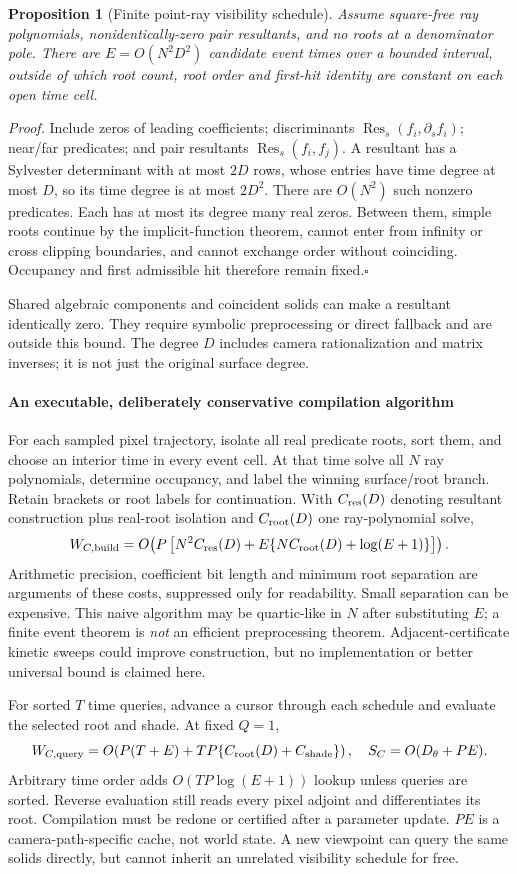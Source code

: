 \documentclass[11pt,letterpaper]{article}
\newcommand{\mini}[1]{\paragraph{#1}}
\newtheorem{prop}{Proposition}
\newcommand{\briefproof}[1]{\textit{Proof.} #1\hfill$\square$\par}
\begin{document}
\begin{prop}[Finite point-ray visibility schedule]
Assume square-free ray polynomials, nonidentically-zero pair resultants, and no roots at a denominator pole. There are $E=O(N^2D^2)$ candidate event times over a bounded interval, outside of which root count, root order and first-hit identity are constant on each open time cell.
\end{prop}
\briefproof{Include zeros of leading coefficients; discriminants $\operatorname{Res}_s(f_i,\partial_s f_i)$; near/far predicates; and pair resultants $\operatorname{Res}_s(f_i,f_j)$. A resultant has a Sylvester determinant with at most $2D$ rows, whose entries have time degree at most $D$, so its time degree is at most $2D^2$. There are $O(N^2)$ such nonzero predicates. Each has at most its degree many real zeros. Between them, simple roots continue by the implicit-function theorem, cannot enter from infinity or cross clipping boundaries, and cannot exchange order without coinciding. Occupancy and first admissible hit therefore remain fixed.}
Shared algebraic components and coincident solids can make a resultant identically zero. They require symbolic preprocessing or direct fallback and are outside this bound. The degree $D$ includes camera rationalization and matrix inverses; it is not just the original surface degree.

\mini{An executable, deliberately conservative compilation algorithm}
For each sampled pixel trajectory, isolate all real predicate roots, sort them, and choose an interior time in every event cell. At that time solve all $N$ ray polynomials, determine occupancy, and label the winning surface/root branch. Retain brackets or root labels for continuation. With $C_{\rm res}(D)$ denoting resultant construction plus real-root isolation and $C_{\rm root}(D)$ one ray-polynomial solve,
\begin{equation}
 W_{C,\rm build}=O\!\left(P\left[N^2 C_{\rm res}(D)+
 E\{N C_{\rm root}(D)+\log(E+1)\}\right]\right). \label{eq:Cbuild}
\end{equation}
Arithmetic precision, coefficient bit length and minimum root separation are arguments of these costs, suppressed only for readability. Small separation can be expensive. This naive algorithm may be quartic-like in $N$ after substituting $E$; a finite event theorem is \emph{not} an efficient preprocessing theorem. Adjacent-certificate kinetic sweeps could improve construction, but no implementation or better universal bound is claimed here.

For sorted $T$ time queries, advance a cursor through each schedule and evaluate the selected root and shade. At fixed $Q=1$,
\begin{equation}
 W_{C,\rm query}=O\!\left(P(T+E)+TP\{C_{\rm root}(D)+C_{\rm shade}\}\right),
 \quad S_C=O(D_\theta+PE). \label{eq:Cquery}
\end{equation}
Arbitrary time order adds $O(TP\log(E+1))$ lookup unless queries are sorted. Reverse evaluation still reads every pixel adjoint and differentiates its root. Compilation must be redone or certified after a parameter update. $PE$ is a camera-path-specific cache, not world state. A new viewpoint can query the same solids directly, but cannot inherit an unrelated visibility schedule for free.
\end{document}
